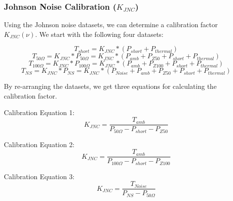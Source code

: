 
\subsubsection{Johnson Noise Calibration ($K_{JNC}$)}

Using the Johnson noise datasets, we can determine a calibration factor $K_{JNC}(\nu)$. We start with the following four datasets:

\begin{equation}
T_{short} = K_{JNC}*(P_{short}+P_{thermal})
\end{equation}
\begin{equation}
T_{50 \Omega} = K_{JNC}*P_{50 \Omega} = K_{JNC}*(P_{amb} + P_{Z50} + P_{short}+P_{thermal})
\end{equation}
\begin{equation}
T_{100 \Omega} = K_{JNC}*P_{100 \Omega} = K_{JNC}*(P_{amb} + P_{Z100}+P_{short}+P_{thermal})
\end{equation}
\begin{equation}
T_{NS} = K_{JNC}*P_{NS} = K_{JNC}*(P_{Noise}+P_{amb}+P_{Z50}+P_{short}+P_{thermal})
\end{equation}

By re-arranging the datasets, we get three equations for calculating the calibration factor.

Calibration Equation 1:
\begin{equation}
K_{JNC} = \frac{T_{amb}}{P_{50 \Omega} - P_{short} - P_{Z50}}
\end{equation}

Calibration Equation 2:
\begin{equation}
K_{JNC} = \frac{T_{amb}}{P_{100 \Omega} - P_{short}-P_{Z100}}
\end{equation}

Calibration Equation  3:
\begin{equation}
K_{JNC} = \frac{T_{Noise}}{P_{NS}-P_{50 \Omega}}
\end{equation}

